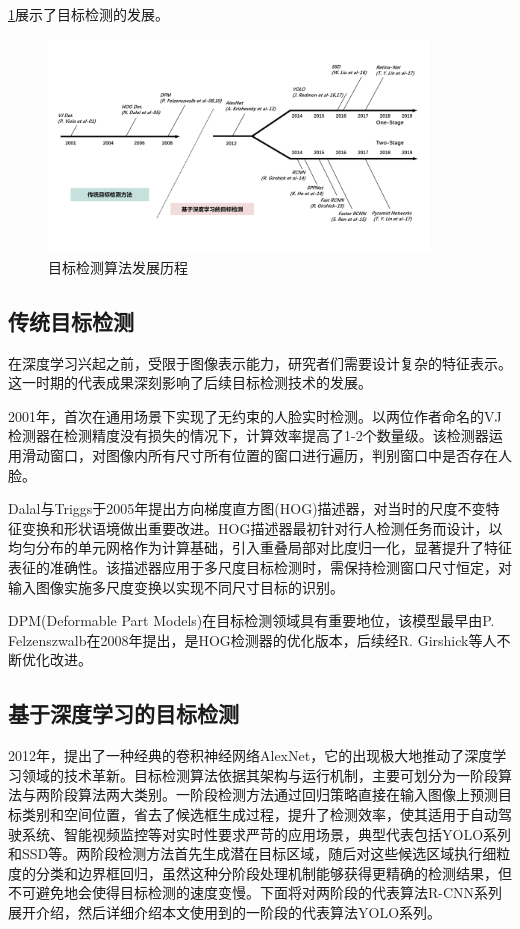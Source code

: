 \ref{fig:his}展示了目标检测的发展。

\begin{figure}[!htb]
  \centering
  \includegraphics[width=0.9\textwidth]{figs/chap01/his.png}
  \caption{目标检测算法发展历程}
  \label{fig:his}
\end{figure}

\subsection{传统目标检测}
在深度学习兴起之前，受限于图像表示能力，研究者们需要设计复杂的特征表示。这一时期的代表成果深刻影响了后续目标检测技术的发展。

2001年，\textcite{Viola2001}首次在通用场景下实现了无约束的人脸实时检测。以两位作者命名的VJ检测器在检测精度没有损失的情况下，计算效率提高了1-2个数量级。该检测器运用滑动窗口，对图像内所有尺寸所有位置的窗口进行遍历，判别窗口中是否存在人脸。

Dalal与Triggs于2005年提出方向梯度直方图(HOG)描述器，对当时的尺度不变特征变换和形状语境做出重要改进\cite{Dalal2005}。HOG描述器最初针对行人检测任务而设计，以均匀分布的单元网格作为计算基础，引入重叠局部对比度归一化，显著提升了特征表征的准确性。该描述器应用于多尺度目标检测时，需保持检测窗口尺寸恒定，对输入图像实施多尺度变换以实现不同尺寸目标的识别。

DPM(Deformable Part Models)在目标检测领域具有重要地位，该模型最早由P. Felzenszwalb在2008年提出\cite{Felzenszwalb2008}，是HOG检测器的优化版本，后续经R. Girshick等人不断优化改进\cite{Felzenszwalb2010Cascade}。

\subsection{基于深度学习的目标检测}
2012年，\textcite{alexNet}提出了一种经典的卷积神经网络AlexNet，它的出现极大地推动了深度学习领域的技术革新。目标检测算法依据其架构与运行机制，主要可划分为一阶段算法与两阶段算法两大类别。一阶段检测方法通过回归策略直接在输入图像上预测目标类别和空间位置，省去了候选框生成过程，提升了检测效率，使其适用于自动驾驶系统、智能视频监控等对实时性要求严苛的应用场景，典型代表包括YOLO系列和SSD等。两阶段检测方法首先生成潜在目标区域，随后对这些候选区域执行细粒度的分类和边界框回归，虽然这种分阶段处理机制能够获得更精确的检测结果，但不可避免地会使得目标检测的速度变慢。下面将对两阶段的代表算法R-CNN系列展开介绍，然后详细介绍本文使用到的一阶段的代表算法YOLO系列。

